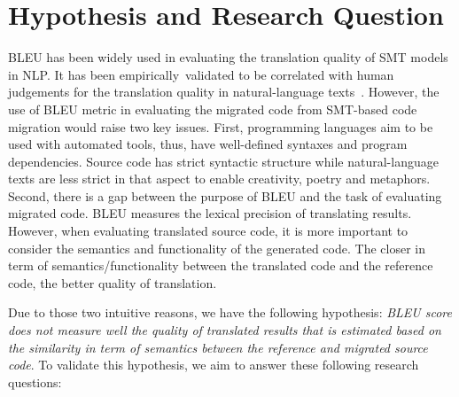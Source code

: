 \section{Hypothesis and Research Question}

BLEU has been widely used in evaluating the translation quality of SMT
models in NLP. It has been empirically~validated to be correlated with
human judgements for the translation quality in natural-language
texts~\cite{Papineni2002}.
%
%
However, the use of BLEU metric in evaluating the migrated code from
SMT-based code migration would raise two key issues. First,
programming languages aim to be used with automated tools, thus, have
well-defined syntaxes and program dependencies. Source code has strict syntactic
structure while natural-language texts are less strict in that aspect
to enable creativity, poetry and metaphors.
%
%
Second, there is a gap between the purpose of BLEU and the task of
evaluating migrated code. BLEU measures the lexical precision of
translating results. However, when evaluating translated source code,
it is more important to consider the semantics and functionality of
the generated code.
%
The closer in term of semantics/functionality between the translated
code and the reference code, the better quality of
translation.
%

Due to those two intuitive reasons, we have the following hypothesis:
{\em BLEU score does not measure well the quality of translated results
that is estimated based on the similarity in term of
semantics between the reference and migrated source code}. To validate
this hypothesis, we aim to answer these following research questions:
%

